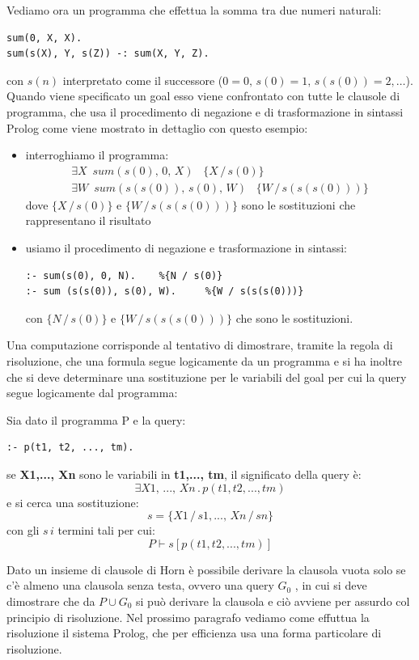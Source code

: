 Vediamo ora un programma che effettua la somma tra due numeri naturali:
\begin{verbatim}
sum(0, X, X).
sum(s(X), Y, s(Z)) -: sum(X, Y, Z).
\end{verbatim}
con $s(n)$ interpretato come il successore ($0=0,\, s(0)=1, \,s(s(0))=2,\dots $).\newline
Quando viene specificato un goal esso viene confrontato con tutte le clausole di programma, che usa il procedimento di negazione
e di trasformazione in sintassi Prolog come viene mostrato in dettaglio con questo esempio:
\begin{itemize}
\item  interroghiamo il programma:
  \begin{equation*}
  \begin{split}
    \exists X\,\,\, sum(s(0),\, 0,\, X)\,\,\,\,\,\{X\,/\, s(0)\} \\
    \exists W\,\,\, sum(s(s(0)),\, s(0), \, W)\,\,\,\,\,\{W\,/\, s(s(s(0)))\}
  \end{split}
  \end{equation*}
dove $\{X\,/\, s(0)\}$ e $\{W\,/\, s(s(s(0)))\}$ sono le sostituzioni che rappresentano il risultato
\item usiamo il procedimento di negazione e trasformazione in sintassi:
\begin{verbatim}
:- sum(s(0), 0, N).    %{N / s(0)}
:- sum (s(s(0)), s(0), W).     %{W / s(s(s(0)))}
\end{verbatim}
con $\{N\, /\, s(0)\}$ e $\{W \,/\, s(s(s(0)))\}$ che sono le sostituzioni.
\end{itemize}
Una computazione corrisponde al tentativo di dimostrare, tramite la regola di risoluzione, che una formula segue logicamente da un programma
e si ha inoltre che si deve determinare una sostituzione per le variabili del goal per cui la query segue  logicamente dal programma:
\begin{esempio}
Sia dato il programma P e la query:
\begin{verbatim}
:- p(t1, t2, ..., tm).
\end{verbatim}
se \textbf{X1,..., Xn} sono le variabili in \textbf{t1,..., tm}, il significato della query è:
\begin{equation*}
  \exists X1,\,..., \,Xn\, . \,p(t1, t2, ..., tm)
\end{equation*}
e si cerca una sostituzione:
\begin{equation*}
  s=\{X1\,/\,s1,...,\, Xn\,/\,sn\}
\end{equation*}
con gli $s\,i$ termini tali per cui:
\begin{equation*}
  P\vdash s[p(t1, t2, ..., tm)]
\end{equation*}
\end{esempio}
Dato un insieme di clausole di Horn è possibile derivare la clausola vuota solo se c'è almeno una clausola senza testa, ovvero una query $G_0$
, in cui si deve dimostrare che da $P \cup G_0$ si può derivare la clausola e ciò avviene per assurdo col principio di risoluzione.\newline
Nel prossimo paragrafo vediamo come effuttua la risoluzione il sistema Prolog, che per efficienza usa una forma particolare di risoluzione.
